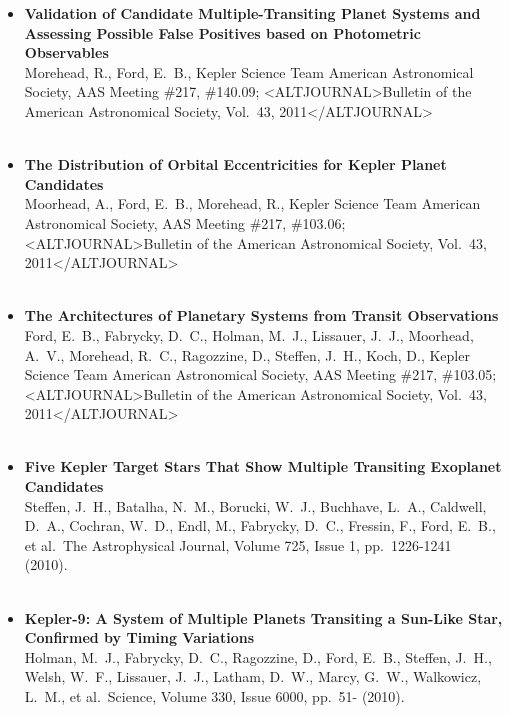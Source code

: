 \documentclass[11pt,letterpaper,sans]{moderncv} %
\begin{document}
\begin{itemize}
 \item \textbf{ Validation of Candidate Multiple-Transiting Planet 
Systems and Assessing Possible False Positives based on Photometric 
Observables } \\ Morehead, R., Ford, E.~B., Kepler Science Team American 
Astronomical Society, AAS Meeting \#217, \#140.09; <ALTJOURNAL>Bulletin of the 
American Astronomical Society, Vol.~43, 2011</ALTJOURNAL> \\ \\ 

 \item \textbf{ The Distribution of Orbital Eccentricities for Kepler 
Planet Candidates } \\ Moorhead, A., Ford, E.~B., Morehead, R., Kepler 
Science Team American Astronomical Society, AAS Meeting \#217, \#103.06; 
<ALTJOURNAL>Bulletin of the American Astronomical Society, Vol.~43, 2011</ALTJOURNAL> \\ \\ 

 \item \textbf{ The Architectures of Planetary Systems from Transit 
Observations } \\ Ford, E.~B., Fabrycky, D.~C., Holman, M.~J., Lissauer, 
J.~J., Moorhead, A.~V., Morehead, R.~C., Ragozzine, D., Steffen, J.~H., 
Koch, D., Kepler Science Team American Astronomical Society, AAS Meeting 
\#217, \#103.05; <ALTJOURNAL>Bulletin of the American Astronomical Society, Vol.~43, 
2011</ALTJOURNAL> \\ \\ 

 \item \textbf{ Five Kepler Target Stars That Show Multiple Transiting 
Exoplanet Candidates } \\ Steffen, J.~H., Batalha, N.~M., Borucki, W.~J., 
Buchhave, L.~A., Caldwell, D.~A., Cochran, W.~D., Endl, M., Fabrycky, 
D.~C., Fressin, F., Ford, E.~B., et al.\ The Astrophysical Journal, Volume 
725, Issue 1, pp.~1226-1241 (2010).\ \\ \\ 

 \item \textbf{ Kepler-9: A System of Multiple Planets Transiting a 
Sun-Like Star, Confirmed by Timing Variations } \\ Holman, M.~J., Fabrycky, 
D.~C., Ragozzine, D., Ford, E.~B., Steffen, J.~H., Welsh, W.~F., Lissauer, 
J.~J., Latham, D.~W., Marcy, G.~W., Walkowicz, L.~M., et al.\ Science, 
Volume 330, Issue 6000, pp.~51- (2010).\ \\ \\ 


\end{itemize}
\end{document}
